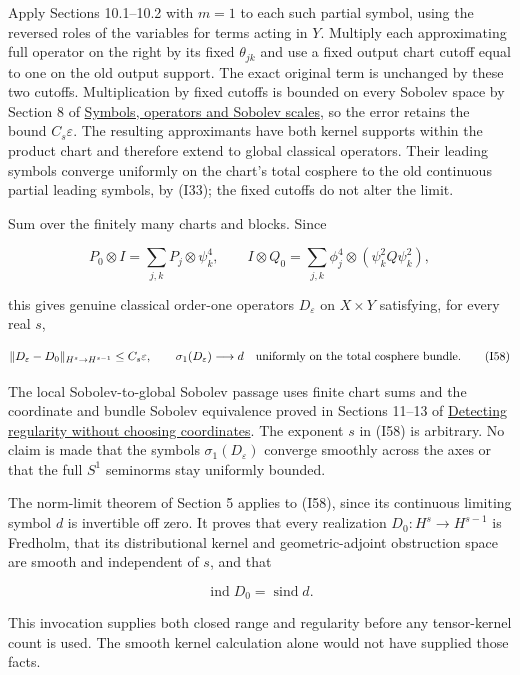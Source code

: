 \documentclass[
  11pt,
]{article}
\begin{document}
Apply Sections 10.1--10.2 with \(m=1\) to each such partial symbol,
using the reversed roles of the variables for terms acting in \(Y\).
Multiply each approximating full operator on the right by its fixed
\(\theta_{jk}\) and use a fixed output chart cutoff equal to one on the
old output support. The exact original term is unchanged by these two
cutoffs. Multiplication by fixed cutoffs is bounded on every Sobolev
space by Section 8 of \href{euclidean-symbol-calculus.pdf}{Symbols,
operators and Sobolev scales}, so the error retains the bound
\(C_s\varepsilon\). The resulting approximants have both kernel supports
within the product chart and therefore extend to global classical
operators. Their leading symbols converge uniformly on the chart's total
cosphere to the old continuous partial leading symbols, by (I33); the
fixed cutoffs do not alter the limit.

Sum over the finitely many charts and blocks. Since

\[
 P_0\otimes I=\sum_{j,k}P_j\otimes\psi_k^4,
 \qquad
 I\otimes Q_0=\sum_{j,k}\phi_j^4\otimes(\psi_k^2Q\psi_k^2),
\]

this gives genuine classical order-one operators \(D_\varepsilon\) on
\(X\times Y\) satisfying, for every real \(s\),

\[
 \|D_\varepsilon-D_0\|_{H^s\to H^{s-1}}
       \leq C_s\varepsilon,
 \qquad
 \sigma_1(D_\varepsilon)\longrightarrow d
          \quad\hbox{uniformly on the total cosphere bundle}.
 \tag{I58}
\]

The local Sobolev-to-global Sobolev passage uses finite chart sums and
the coordinate and bundle Sobolev equivalence proved in Sections 11--13
of \href{geometric-microlocal-calculus.pdf}{Detecting regularity without
choosing coordinates}. The exponent \(s\) in (I58) is arbitrary. No
claim is made that the symbols \(\sigma_1(D_\varepsilon)\) converge
smoothly across the axes or that the full \(S^1\) seminorms stay
uniformly bounded.

The norm-limit theorem of Section 5 applies to (I58), since its
continuous limiting symbol \(d\) is invertible off zero. It proves that
every realization \(D_0:H^s\to H^{s-1}\) is Fredholm, that its
distributional kernel and geometric-adjoint obstruction space are smooth
and independent of \(s\), and that

\[
 \operatorname{ind}D_0=\operatorname{sind}d.
 \tag{I59}
\]

This invocation supplies both closed range and regularity before any
tensor-kernel count is used. The smooth kernel calculation alone would
not have supplied those facts.
\end{document}
